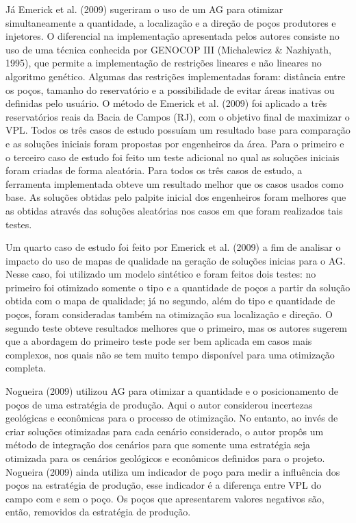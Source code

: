 Já Emerick et al. (2009) sugeriram o uso de um AG para otimizar simultaneamente a quantidade, a localização e a direção de poços produtores e injetores. O diferencial na implementação apresentada pelos autores consiste no uso de uma técnica conhecida por GENOCOP III (Michalewicz \& Nazhiyath, 1995), que permite a implementação de restrições lineares e não lineares no algoritmo genético. Algumas das restrições implementadas foram: distância entre os poços, tamanho do reservatório e a possibilidade de evitar áreas inativas ou definidas pelo usuário. O método de Emerick et al. (2009) foi aplicado a três reservatórios reais da Bacia de Campos (RJ), com o objetivo final de maximizar o VPL. Todos os três casos de estudo possuíam um resultado base para comparação e as soluções iniciais foram propostas por engenheiros da área. Para o primeiro e o terceiro caso de estudo foi feito um teste adicional no qual as soluções iniciais foram criadas de forma aleatória. Para todos os três casos de estudo, a ferramenta implementada obteve um resultado melhor que os casos usados como base. As soluções obtidas pelo palpite inicial dos engenheiros foram melhores que as obtidas através das soluções aleatórias nos casos em que foram realizados tais testes.

Um quarto caso de estudo foi feito por Emerick et al. (2009) a fim de analisar o impacto do uso de mapas de qualidade na geração de soluções inicias para o AG. Nesse caso, foi utilizado um modelo sintético e foram feitos dois testes: no primeiro foi otimizado somente o tipo e a quantidade de poços a partir da solução obtida com o mapa de qualidade; já no segundo, além do tipo e quantidade de poços, foram consideradas também na otimização sua localização e direção. O segundo teste obteve resultados melhores que o primeiro, mas os autores sugerem que a abordagem do primeiro teste pode ser bem aplicada em casos mais complexos, nos quais não se tem muito tempo disponível para uma otimização completa.

Nogueira (2009) utilizou AG para otimizar a quantidade e o posicionamento de poços de uma estratégia de produção. Aqui o autor considerou incertezas geológicas e econômicas para o processo de otimização. No entanto, ao invés de criar soluções otimizadas para cada cenário considerado, o autor propôs um método de integração dos cenários para que somente uma estratégia seja otimizada para os cenários geológicos e econômicos definidos para o projeto. Nogueira (2009) ainda utiliza um indicador de poço para medir a influência dos poços na estratégia de produção, esse indicador é a diferença entre VPL do campo com e sem o poço. Os poços que apresentarem valores negativos são, então, removidos da estratégia de produção. 


